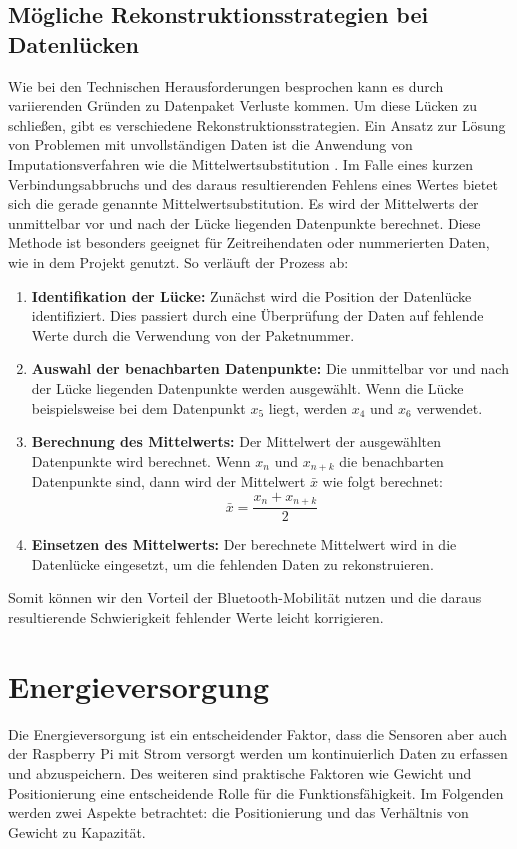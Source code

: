 \subsection{Mögliche Rekonstruktionsstrategien bei Datenlücken}
Wie bei den Technischen Herausforderungen besprochen kann es durch variierenden Gründen zu Datenpaket Verluste kommen. Um diese Lücken zu schließen, gibt es verschiedene Rekonstruktionsstrategien. Ein Ansatz zur Lösung von Problemen mit unvollständigen Daten ist die Anwendung von Imputationsverfahren wie die Mittelwertsubstitution \cite{noor2015comparison}. Im Falle eines kurzen Verbindungsabbruchs und des daraus resultierenden Fehlens eines Wertes bietet sich die gerade genannte Mittelwertsubstitution. Es wird der Mittelwerts der unmittelbar vor und nach der Lücke liegenden Datenpunkte berechnet. Diese Methode ist besonders geeignet für Zeitreihendaten oder nummerierten Daten, wie in dem Projekt genutzt. So verläuft der Prozess ab:

\begin{enumerate}
	\item \textbf{Identifikation der Lücke:} Zunächst wird die Position der Datenlücke identifiziert. Dies passiert durch eine Überprüfung der Daten auf fehlende Werte durch die Verwendung von der Paketnummer.
	\item \textbf{Auswahl der benachbarten Datenpunkte:} Die unmittelbar vor und nach der Lücke liegenden Datenpunkte werden ausgewählt. Wenn die Lücke beispielsweise bei dem Datenpunkt \( x_{5} \) liegt, werden \( x_{4} \) und \( x_{6} \) verwendet.
	\item \textbf{Berechnung des Mittelwerts:} Der Mittelwert der ausgewählten Datenpunkte wird berechnet. Wenn \( x_{n} \) und \( x_{n+k} \) die benachbarten Datenpunkte sind, dann wird der Mittelwert \( \bar{x} \) wie folgt berechnet: 
	\[
	\bar{x} = \frac{x_{n} + x_{n+k}}{2}
	\]
	\item \textbf{Einsetzen des Mittelwerts:} Der berechnete Mittelwert wird in die Datenlücke eingesetzt, um die fehlenden Daten zu rekonstruieren.
\end{enumerate}

Somit können wir den Vorteil der Bluetooth-Mobilität nutzen und die daraus resultierende Schwierigkeit fehlender Werte leicht korrigieren.
\newpage

\section{Energieversorgung}
Die Energieversorgung ist ein entscheidender Faktor, dass die Sensoren aber auch der Raspberry Pi mit Strom versorgt werden um kontinuierlich Daten zu erfassen und abzuspeichern. Des weiteren sind praktische Faktoren wie Gewicht und Positionierung eine entscheidende Rolle für die Funktionsfähigkeit. Im Folgenden werden zwei Aspekte betrachtet: die Positionierung und das Verhältnis von Gewicht zu Kapazität.

